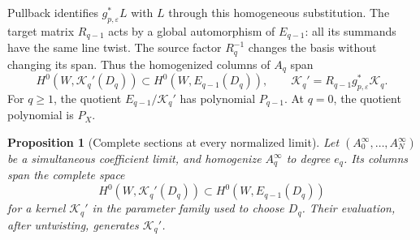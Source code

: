 \documentclass[11pt,reqno]{amsart}
\numberwithin{equation}{section}
\newtheorem{proposition}[theorem]{Proposition}
\theoremstyle{definition}
\theoremstyle{remark}
\begin{document}
Pullback identifies \(g_{p,\varepsilon}^*L\) with \(L\) through this
homogeneous substitution. The target matrix \(R_{q-1}\) acts by a
global automorphism of \(E_{q-1}\): all its summands have the same
line twist. The source factor \(R_q^{-1}\) changes the basis without
changing its span. Thus the homogenized columns of \(A_q\) span
\begin{equation}
 H^0(W,\mathscr K_q'(D_q))
 \subset H^0(W,E_{q-1}(D_q)),
 \qquad
 \mathscr K_q'=R_{q-1}g_{p,\varepsilon}^*\mathscr K_q.
 \label{alg:transformed-sections}
\end{equation}
For \(q\geq1\), the quotient \(E_{q-1}/\mathscr K_q'\) has polynomial
\(P_{q-1}\). At \(q=0\), the quotient polynomial is \(P_X\).

\begin{proposition}[Complete sections at every normalized limit]
\label{alg:complete-limit}
Let \((A_0^\infty,\ldots,A_N^\infty)\) be a simultaneous coefficient
limit, and homogenize \(A_q^\infty\) to degree \(e_q\). Its columns
span the complete space
\[
 H^0(W,\mathscr K_q'(D_q))
 \subset H^0(W,E_{q-1}(D_q))
\]
for a kernel \(\mathscr K_q'\) in the parameter family used to choose
\(D_q\). Their evaluation, after untwisting, generates
\(\mathscr K_q'\).
\end{proposition}
\end{document}
